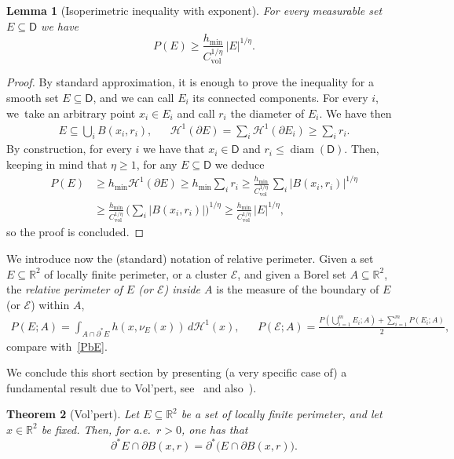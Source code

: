\documentclass[10pt]{amsart}
\DeclareMathOperator{\diam}{diam}
\newcommand\R{\mathbb{R}}
\newcommand\Cgr{C_\mathrm{vol}}
\newcommand\E{\mathcal{E}}
\renewcommand\H{\mathcal{H}}
\theoremstyle{plain}
\newtheorem{thm}{Theorem}[section]
\newtheorem{lem}[thm]{Lemma}
\theoremstyle{definition}
\begin{document}
\begin{lem}[Isoperimetric inequality with exponent]\label{disgusting}
For every measurable set $E\subseteq \mathsf{D}$ we have
\[
P(E) \geq \frac{h_{\min}}{\Cgr^{1/\eta}}\, |E|^{1/\eta}.
\]
\end{lem}
\begin{proof}
By standard approximation, it is enough to prove the inequality for a smooth set $E\subseteq \mathsf{D}$, and we can call $E_i$ its connected components. For every $i$, we~take an arbitrary point $x_i\in E_i$ and call $r_i$ the diameter of $E_i$. We have then
\begin{align*}
E\subseteq \bigcup_i B(x_i,r_i), && \H^1(\partial E)=\sum_i \H^1(\partial E_i) \geq \sum_i r_i.
\end{align*}
By construction, for every $i$ we have that $x_i\in \mathsf{D}$ and $r_i\leq \diam(\mathsf{D})$. Then, keeping in mind that $\eta\geq 1$, for any $E\subseteq \mathsf{D}$ we deduce
\[\begin{split}
P(E)&\geq h_{\min} \H^1(\partial E)
\geq h_{\min} \sum\nolimits_i r_i
\geq \frac{h_{\min}}{\Cgr^{1/\eta}}\, \sum\nolimits_i |B(x_i,r_i)|^{1/\eta}\\
&\geq \frac{h_{\min}}{\Cgr^{1/\eta}}\, \Big(\sum\nolimits_i |B(x_i,r_i)|\Big)^{1/\eta}
\geq \frac{h_{\min}}{\Cgr^{1/\eta}}\, |E|^{1/\eta},
\end{split}\]
so the proof is concluded.
\end{proof}

We introduce now the (standard) notation of relative perimeter. Given a set $E\subseteq\R^2$ of locally finite perimeter, or a cluster $\E$, and given a Borel set $A\subseteq \R^2$, the \emph{relative perimeter of $E$ (or $\E$) inside $A$} is the measure of the boundary of $E$ (or $\E$) within $A$, \ie
\begin{align*}
P(E;A) = \int_{A\cap\partial^* E} h(x,\nu_E(x))\, d\H^1(x), &&
P(\E;A) = \frac{P(\bigcup_{i=1}^m E_i;A) + \sum_{i=1}^m P(E_i;A) }2 ,
\end{align*}
compare with~\eqref{PbE}.

We conclude this short section by presenting (a very specific case of) a fundamental result due to Vol'pert, see~\cite{Volpert} and also~\cite[Th.\,3.108]{AFP}).
\begin{thm}[Vol'pert]\label{volpert}
Let $E\subseteq\R^2$ be a set of locally finite perimeter, and let $x\in\R^2$ be fixed. Then, for a.e.\ $r>0$, one has that
\[
\partial^* E \cap \partial B(x,r) = \partial^* \big( E \cap \partial B(x,r)\big).
\]
\end{thm}
\end{document}
